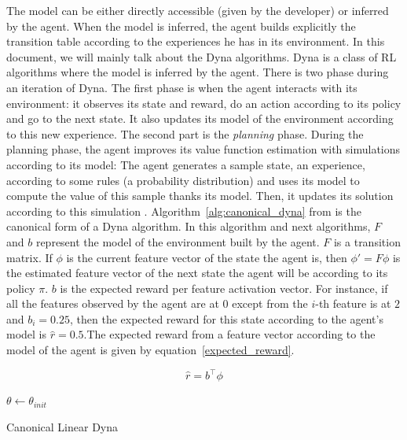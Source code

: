 \documentclass[]{article}
\begin{document}
The model can be either directly accessible (given by the developer) or inferred by the agent. When the model is inferred, the agent builds explicitly the transition table according to the experiences he has in its environment. In this document, we will mainly talk about the Dyna algorithms. Dyna is a class of RL algorithms where the model is inferred by the agent. There is two phase during an iteration of Dyna. The first phase is when the agent interacts with its environment: it observes its state and reward, do an action according to its policy and go to the next state. It also updates its model of the environment according to this new experience. The second part is the \emph{planning} phase. During the planning phase, the agent improves its value function estimation with simulations according to its model: The agent generates a sample state, an experience, according to some rules (a probability distribution) and uses its model to compute the value of this sample thanks its model. Then, it updates its solution according to this simulation \parencite{sutton_dyna-style_2012}.
Algorithm~\ref{alg:canonical_dyna} from \textcite{sutton_dyna-style_2012} is the canonical form of a Dyna algorithm. In this algorithm and next algorithms, \(F\) and \(b\) represent the model of the environment built by the agent. \(F\) is a transition matrix. If \(\phi\) is the current feature vector of the state the agent is, then \(\phi' = F\phi\) is the estimated feature vector of the next state the agent will be according to its policy \(\pi\). \(b\) is the expected reward per feature activation vector. For instance, if all the features observed by the agent are at \(0\) except from the \(i\)-th feature is at \(2\) and \(b_i = 0.25\), then the expected reward for this state according to the agent's model is \(\hat{r} = 0.5\).The expected reward from a feature vector according to the model of the agent is given by equation~\ref{expected_reward}.

\begin{equation}
\hat{r} = b^\top \phi \label{expected_reward}
\end{equation}

\begin{algorithm}[htbp]
  \DontPrintSemicolon
  \SetAlgoNoLine
  \(\theta \gets \theta_{init}\)\;
  \caption{Canonical Linear Dyna \label{alg:canonical_dyna}}
\end{algorithm}
\end{document}
